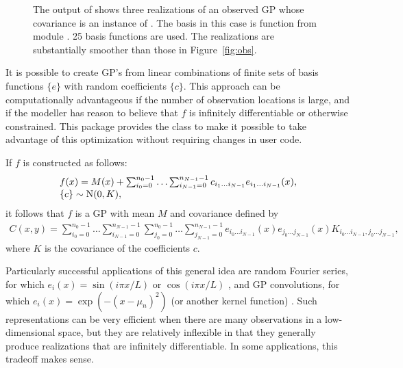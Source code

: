 \documentclass[article]{jss}
\begin{document}
\begin{figure}[htbp]
    \centering
        \caption{The output of  shows three realizations of an observed GP whose covariance is an instance of . The basis in this case is function  from module . 25 basis functions are used. The realizations are substantially smoother than those in Figure~\ref{fig:obs}.}
    \label{fig:basiscov}
\end{figure}

It is possible to create GP's from linear combinations of finite sets of basis functions $\{e\}$ with random coefficients $\{c\}$. This approach can be computationally advantageous if the number of observation locations is large, and if the modeller has reason to believe that $f$ is infinitely differentiable or otherwise constrained. This package provides the  class to make it possible to take advantage of this optimization without requiring changes in user code. 

If $f$ is constructed as follows:
\begin{equation}
    \label{eq:basis-construction} 
    \begin{array}{l}
        f(x) = M(x) + \sum_{i_0=0}^{n_0-1}\ldots \sum_{i_{N-1}=0}^{n_{N-1}-1} c_{i_1\ldots i_{N-1}} e_{i_1\ldots i_{N-1}}(x), \\
        \{c\}\sim \textup{N}(0,K),
    \end{array}
\end{equation}
it follows that $f$ is a GP with mean $M$ and covariance defined by
\begin{eqnarray*}
    C(x,y)=\sum_{i_0=0}^{n_0-1}\ldots \sum_{i_{N-1}=0}^{n_{N-1}-1} \sum_{j_0=0}^{n_0-1}\ldots \sum_{j_{N-1}=0}^{n_{N-1}-1} e_{i_0\ldots i_{N-1}}(x) e_{j_0\ldots j_{N-1}}(x) K_{i_0\ldots i_{N-1}, j_0\ldots j_{N-1}},
\end{eqnarray*}
where $K$ is the covariance of the coefficients $c$.

Particularly successful applications of this general idea are random Fourier series, for which $e_i(x) = \sin(i\pi x/L)$ or $\cos(i\pi x/L)$ \citep{spanos}, and GP convolutions, for which $e_i(x) = \exp(-(x-\mu_n)^2)$ (or another kernel function) \citep{convolution}. Such representations can be very efficient when there are many observations in a low-dimensional space, but they are relatively inflexible in that they generally produce realizations that are infinitely differentiable. In some applications, this tradeoff makes sense.
\end{document}
